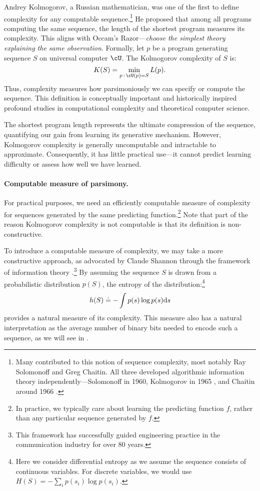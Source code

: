 \documentclass[../../book-main.tex]{subfiles}
\begin{document}
Andrey Kolmogorov, a Russian mathematician, was one of the first to define complexity for any computable sequence.\footnote{Many contributed to this notion of sequence complexity, most notably Ray Solomonoff and Greg Chaitin. All three developed algorithmic information theory independently---Solomonoff in 1960, Kolmogorov in 1965 \cite{Kolmogorov1998OnTO}, and Chaitin around 1966 \cite{Chaitin-1966}.} He proposed that among all programs computing the same sequence, the length of the shortest program measures its complexity. This aligns with Occam's Razor---\textit{choose the simplest theory explaining the same observation}. Formally, let \(p\) be a program generating sequence \(S\) on universal computer \(\cU\). The Kolmogorov complexity of \(S\) is:
\begin{equation}
    K(S) = \min_{p\,:\, \cU(p) = S} L(p). 
\end{equation}
Thus, complexity measures how parsimoniously we can specify or compute the sequence. This definition is conceptually important and historically inspired profound studies in computational complexity and theoretical computer science.

The shortest program length represents the ultimate compression of the sequence, quantifying our gain from learning its generative mechanism. However, Kolmogorov complexity is generally uncomputable \cite{Cover-Thomas} and intractable to approximate. Consequently, it has little practical use---it cannot predict learning difficulty or assess how well we have learned.


\paragraph{Computable measure of parsimony.}
For practical purposes, we need an efficiently computable measure of complexity for sequences generated by the same predicting function.\footnote{In practice, we typically care about learning the predicting function \(f\), rather than any particular sequence generated by \(f\).} Note that part of the reason Kolmogorov complexity is not computable is that its definition is non-constructive.

To introduce a computable measure of complexity, we may take a more constructive approach, as advocated by Claude Shannon through the framework of information theory \cite{Shannon-1948,Cover-Thomas}.\footnote{This framework has successfully guided engineering practice in the communication industry for over 80 years.} By assuming the sequence \(S\) is drawn from a probabilistic distribution \(p(S)\), the entropy of the distribution:\footnote{Here we consider differential entropy as we assume the sequence consists of continuous variables. For discrete variables, we would use \(H(S) = - \sum_{i}p(s_{i}) \log p(s_{i})\).}
\begin{equation}
    h(S) \doteq -\int p(s) \log p(s) \mathrm{d}s
    \label{eqn:entropy-definition}
\end{equation}
provides a natural measure of its complexity. This measure also has a natural interpretation as the average number of binary bits needed to encode such a sequence, as we will see in .
\end{document}
